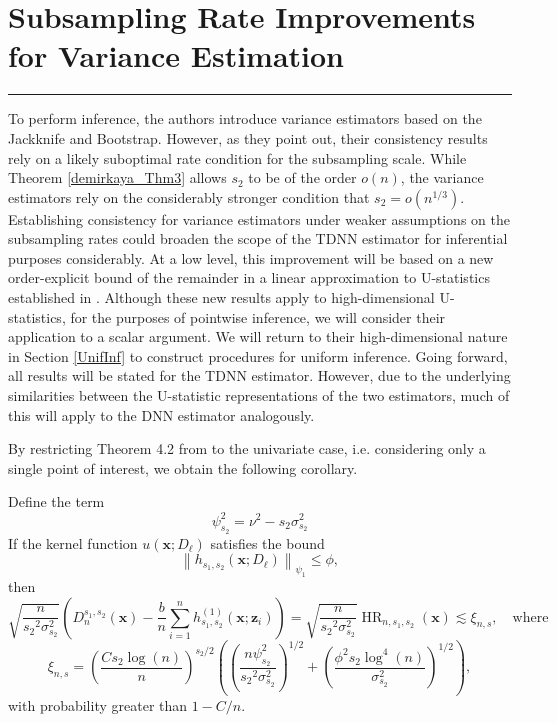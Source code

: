 \documentclass[letterpaper,10pt]{article}
\numberwithin{equation}{section}
\numberwithin{theorem}{section}
\numberwithin{remark}{section}
\numberwithin{example}{section}
\theoremstyle{definition}
\newcommand{\1}{\mathbb{1}}
\begin{document}
\section{Subsampling Rate Improvements for Variance Estimation}\label{Subsampling_Improvements}
\hrule
To perform inference, the authors introduce variance estimators based on the Jackknife and Bootstrap.
However, as they point out, their consistency results rely on a likely suboptimal rate condition for the subsampling scale.
While Theorem \ref{demirkaya_Thm3} allows $s_2$ to be of the order $o(n)$, the variance estimators rely on the considerably stronger condition that $s_2 = o(n^{1/3})$.
Establishing consistency for variance estimators under weaker assumptions on the subsampling rates could broaden the scope of the TDNN estimator for inferential purposes considerably.
At a low level, this improvement will be based on a new order-explicit bound of the remainder in a linear approximation to U-statistics established in \citet{ritzwoller_uniform_2024}.
Although these new results apply to high-dimensional U-statistics, for the purposes of pointwise inference, we will consider their application to a scalar argument.
We will return to their high-dimensional nature in Section \ref{UnifInf} to construct procedures for uniform inference.
Going forward, all results will be stated for the TDNN estimator.
However, due to the underlying similarities between the U-statistic representations of the two estimators, much of this will apply to the DNN estimator analogously.

By restricting Theorem 4.2 from \citet{ritzwoller_uniform_2024} to the univariate case, i.e. considering only a single point of interest, we obtain the following corollary.
\vspace{0.5cm}
\begin{corollary}
	Define the term
	\begin{equation}
		\psi_{s_2}^2 = \nu^2 - s_2 \sigma_{s_2}^2
	\end{equation}
	If the kernel function $u\left(\mathbf{x} ; D_{\ell}\right)$ satisfies the bound
	\begin{equation}
		\left\|h_{s_1, s_2}(\mathbf{x}; D_{\ell})\right\|_{\psi_1} \leq \phi,
	\end{equation}
	then
	\begin{equation}
		\sqrt{\frac{n}{{s_2}^2 \sigma_{s_2}^2}}
		\left(D_{n}^{s_1, s_2}(\mathbf{x}) - \frac{b}{n} \sum_{i=1}^n h^{(1)}_{s_1, s_2}(\mathbf{x}; \mathbf{z}_{i})\right)
		= \sqrt{\frac{n}{{s_2}^2 \sigma_{s_2}^2}} \operatorname{HR}_{n, s_1, s_2}(\mathbf{x})
		\lesssim \xi_{n, s},
		\quad \text {where}
	\end{equation}
	\begin{equation}
		\xi_{n, s}
		= \left(\frac{C s_2 \log(n)}{n}\right)^{s_2 / 2}\left(\left(\frac{n \psi_{s_2}^2}{{s_2}^2 \sigma_{s_2}^2}\right)^{1 / 2}+\left(\frac{\phi^2 s_2 \log ^4(n)}{\sigma_{s_2}^2}\right)^{1 / 2}\right),
	\end{equation}
	with probability greater than $1-C / n$.
\end{corollary}
\end{document}
